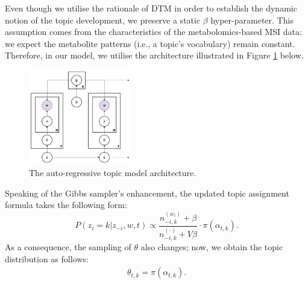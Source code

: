 \documentclass{mpaper}
\begin{document}
\par Even though we utilise the rationale of DTM in order to establish the dynamic notion of the topic development, we preserve a static $\beta$ hyper-parameter. This assumption comes from the characteristics of the metabolomics-based MSI data: we expect the metabolite patterns (i.e., a topic's vocabulary) remain constant. Therefore, in our model, we utilise the architecture illustrated in Figure \ref{fig:arch_ar} below.
\begin{figure}[H]
  \centering
  \includegraphics[width=0.4\textwidth]{ar-architecture.png}
  \caption{The auto-regressive topic model architecture.}
  \label{fig:arch_ar}
\end{figure}

\par Speaking of the Gibbs sampler's enhancement, the updated topic assignment formula takes the following form:
\begin{equation*}
P(z_i = k | z_{-i}, w, t) \propto \dfrac{n_{-i, k}^{(w_i)} + \beta}{n_{-i, k}^{(\cdot)} + V\beta}\cdot \pi(\alpha_{t,k}).
\end{equation*}
As a consequence, the sampling of $\theta$ also changes; now, we obtain the topic distribution as follows:
\begin{align*}
\theta_{t,k} = \pi(\alpha_{t,k}).
\end{align*}
\end{document}
